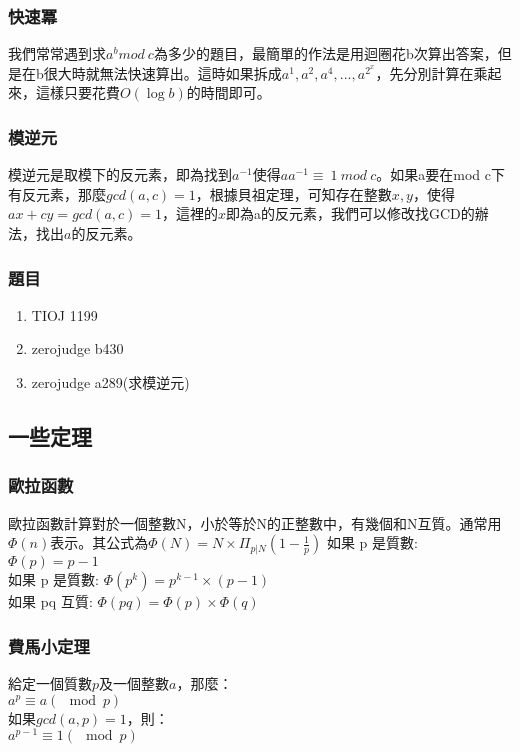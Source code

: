 \subsubsection{快速冪}
我們常常遇到求$a^b mod\ c$為多少的題目，最簡單的作法是用迴圈花b次算出答案，但是在b很大時就無法快速算出。這時如果拆成$a^1,a^2,a^4,...,a^{2^x}$，先分別計算在乘起來，這樣只要花費$O(\log b)$的時間即可。

\subsubsection{模逆元}
模逆元是取模下的反元素，即為找到$a^{-1}$使得$aa^{-1}\equiv\ 1\ mod\ c$。如果a要在mod c下有反元素，那麼$gcd(a,c)=1$，根據貝祖定理，可知存在整數$x,y$，使得$ax+cy=gcd(a,c)=1$，這裡的$x$即為a的反元素，我們可以修改找GCD的辦法，找出$a$的反元素。

\subsubsection{題目}
\begin{enumerate}
\item TIOJ 1199
\item zerojudge b430
\item zerojudge a289(求模逆元)
\end{enumerate}
\subsection{一些定理}
\subsubsection{歐拉函數}
歐拉函數計算對於一個整數N，小於等於N的正整數中，有幾個和N互質。通常用$\Phi(n)$表示。其公式為$\Phi(N)=N\times\Pi_{p|N}(1-\frac{1}{p})$
如果 p 是質數: $\Phi(p) = p-1$\\
如果 p 是質數: $\Phi(p^k)=p^{k−1}\times (p−1)$\\
如果 pq 互質: $\Phi(pq) = \Phi(p)\times\Phi(q)$\\

\subsubsection{費馬小定理}
給定一個質數$p$及一個整數$a$，那麼：\\
$a^p \equiv a (\mod p)$\\
如果$gcd(a,p)=1$，則：\\
$a^{p-1} \equiv 1 (\mod p)$\\
